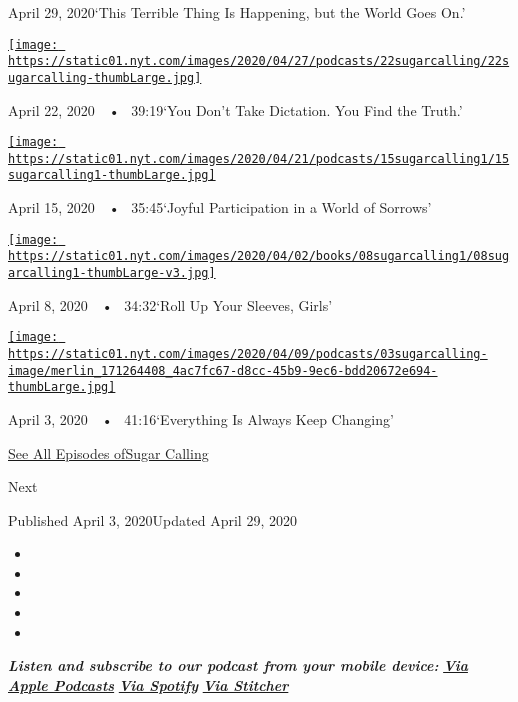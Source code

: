 April 29, 2020`This Terrible Thing Is Happening, but the World Goes On.'

\href{https://www.nytimes.com/2020/04/22/podcasts/sugar-calling-amy-tan-quarantine-virus.html?action=click\&module=audio-series-bar\&region=header\&pgtype=Article}{\texttt{[image: https://static01.nyt.com/images/2020/04/27/podcasts/22sugarcalling/22sugarcalling-thumbLarge.jpg]}}

April 22, 2020~~•~ 39:19`You Don't Take Dictation. You Find the Truth.'

\href{https://www.nytimes.com/2020/04/15/podcasts/sugar-calling-pico-iyer-coronavirus.html?action=click\&module=audio-series-bar\&region=header\&pgtype=Article}{\texttt{[image: https://static01.nyt.com/images/2020/04/21/podcasts/15sugarcalling1/15sugarcalling1-thumbLarge.jpg]}}

April 15, 2020~~•~ 35:45`Joyful Participation in a World of Sorrows'

\href{https://www.nytimes.com/2020/04/08/podcasts/sugar-calling-margaret-atwood-coronavirus.html?action=click\&module=audio-series-bar\&region=header\&pgtype=Article}{\texttt{[image: https://static01.nyt.com/images/2020/04/02/books/08sugarcalling1/08sugarcalling1-thumbLarge-v3.jpg]}}

April 8, 2020~~•~ 34:32`Roll Up Your Sleeves, Girls'

\href{https://www.nytimes.com/2020/04/03/podcasts/sugar-calling-george-saunders-coronavirus.html?action=click\&module=audio-series-bar\&region=header\&pgtype=Article}{\texttt{[image: https://static01.nyt.com/images/2020/04/09/podcasts/03sugarcalling-image/merlin\_171264408\_4ac7fc67-d8cc-45b9-9ec6-bdd20672e694-thumbLarge.jpg]}}

April 3, 2020~~•~ 41:16`Everything Is Always Keep Changing'

\href{https://www.nytimes.com/column/sugar-calling}{See All Episodes
ofSugar Calling}

Next

Published April 3, 2020Updated April 29, 2020

\begin{itemize}
\item
\item
\item
\item
\item
\end{itemize}

\emph{\textbf{Listen and subscribe to our podcast from your mobile
device:}}
\textbf{\href{https://podcasts.apple.com/us/podcast/sugar-calling/id1505881384}{\emph{Via
Apple Podcasts}}} \emph{\textbf{\textbar{}}}
\textbf{\href{https://open.spotify.com/show/4U8hPiNGIBvTS9zLeiDCN7?si=gRyigD47SPWl-QWgNjgt2w}{\emph{Via
Spotify}}} \emph{\textbf{\textbar{}}}
\textbf{\href{https://www.stitcher.com/podcast/the-new-york-times/sugar-calling}{\emph{Via
Stitcher}}}

